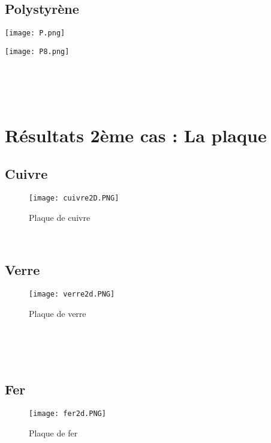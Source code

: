 \documentclass[french]{report}
\begin{document}
  \subsection{Polystyrène}
\begin{minipage}[c]{.46\linewidth}
     \begin{center}
             \texttt{[image: P.png]}
         \end{center}
   \end{minipage} \hfill
   \begin{minipage}[c]{.46\linewidth}
    \begin{center}
            \texttt{[image: P8.png]}
        \end{center}
 \end{minipage}\\\\\\
 
 \newpage
 \section{Résultats 2ème cas : La plaque}
\subsection{Cuivre}

\begin{figure}[htbp] 
   \begin{center} 
      \texttt{[image: cuivre2D.PNG]} 
   \end{center} 
   \caption{\footnotesize Plaque de cuivre} 
\end{figure} \\
\subsection{Verre}
\begin{figure}[htbp] 
   \begin{center} 
      \texttt{[image: verre2d.PNG]} 
   \end{center} 
   \caption{\footnotesize Plaque de verre} 
\end{figure} \\\\\\
\subsection{Fer}
\begin{figure}[htbp] 
   \begin{center} 
      \texttt{[image: fer2d.PNG]} 
   \end{center} 
   \caption{\footnotesize Plaque de fer} 
\end{figure} \\\\\
\end{document}
